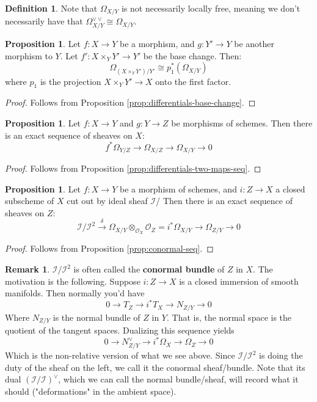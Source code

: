 \documentclass[10pt,reqno]{amsart}
\theoremstyle{definition}
\newtheorem{definition}[theorem]{Definition}
\newtheorem{proposition}[theorem]{Proposition}
\newtheorem{remark}[theorem]{Remark}
\theoremstyle{remark}
\numberwithin{equation}{section}
\numberwithin{theorem}{section}
\newcommand*{\red}{\textcolor{red}}
\newcommand{\OO}{{\mathcal O}}
\newcommand{\II}{{\mathscr I}}
\begin{document}
\begin{definition} Note that $\Omega_{X/Y}$ is not necessarily locally free, meaning we don't necessarily have that $\Omega_{X/Y}^{\vee \vee} \cong \Omega_{X/Y}$. %
\end{definition}

\begin{proposition} Let $f:X \to Y$ be a morphism, and $g: Y' \to Y$ be another morphism to $Y$. Let $f': X \times_Y Y' \to Y'$ be the base change. Then:
\[\Omega_{(X \times_Y Y')/Y'} \cong p_1^*(\Omega_{X/Y})\]
where $p_1$ is the projection $X \times_Y Y' \to X$ onto the first factor.
\end{proposition}
\begin{proof}
Follows from Proposition \ref{prop:differentials-base-change}.
\end{proof}

\begin{proposition} Let $f: X \to Y$ and $g: Y \to Z$ be morphisms of schemes. Then there is an exact sequence of sheaves on $X$:
\[f^*\Omega_{Y/Z} \to \Omega_{X/Z} \to \Omega_{X/Y} \to 0\]
\end{proposition}
\begin{proof}
Follows from Proposition \ref{prop:differentials-two-maps-seq}.
\end{proof}

\begin{proposition} Let $f:X \to Y$ be a morphism of schemes, and $i: Z \to X$ a closed subscheme of $X$ cut out by ideal sheaf $\II$/ Then there is an exact sequence of sheaves on $Z$:
\[\II/\II^2 \stackrel{\delta}{\to} \Omega_{X/Y} \otimes_{\OO_X} \OO_Z = i^*\Omega_{X/Y} \to \Omega_{Z/Y} \to 0\]
\end{proposition}
\begin{proof}
Follows from Proposition \ref{prop:conormal-seq}.
\end{proof}

\begin{remark}
$\II/\II^2$ is often called the \textbf{conormal bundle} of $Z$ in $X$. The motivation is the following. Suppose $i: Z \to X$ is a closed immersion of smooth manifolds. Then normally you'd have
\[0 \to T_Z \to i^*T_X \to N_{Z/Y} \to 0\]
Where $N_{Z/Y}$ is the normal bundle of $Z$ in $Y$. That is, the normal space is the quotient of the tangent spaces. Dualizing this sequence yields
\[0 \to N_{Z/Y}^{\vee} \to i^*\Omega_X \to \Omega_Z \to 0\]
Which is the non-relative version of what we see above. Since $\II/\II^2$ is doing the duty of the sheaf on the left, we call it the conormal sheaf/bundle. Note that its dual $(\II/\II)^{\vee}$, which we can call the normal bundle/sheaf, will record what it should ("deformations" in the ambient space).
\end{remark}
\end{document}

